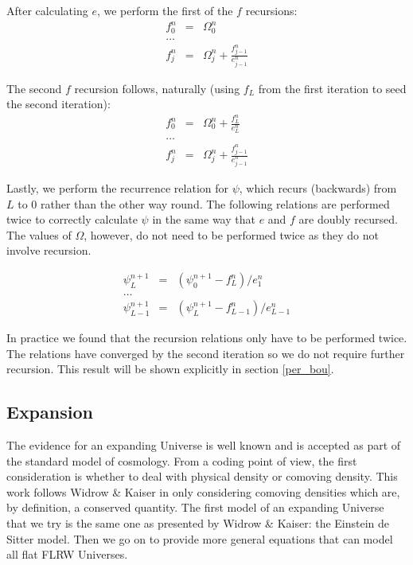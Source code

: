 \noindent After calculating $e$, we perform the first of the $f$ recursions:
\begin{eqnarray}
f_{0}^n &=&  \Omega_{0}^n \nonumber \\
\ldots \nonumber \\
f_{j}^n &=&  \Omega_{j}^n +  \frac{f_{j-1}^n}{e_{j-1}^n}
\end{eqnarray}

\noindent The second $f$ recursion follows, naturally (using $f_L$ from the first iteration to seed the second iteration):
\begin{eqnarray}
f_{0}^n &=&  \Omega_{0}^n +  \frac{f_{L}^n}{e_{L}^n} \nonumber \\
\ldots \nonumber \\
f_{j}^n &=&  \Omega_{j}^n +  \frac{f_{j-1}^n}{e_{j-1}^n}
\end{eqnarray}

\noindent Lastly, we perform the recurrence relation for $\psi$, which recurs (backwards) from $L$ to $0$ rather than the other way round. The following relations are performed twice to correctly calculate $\psi$ in the same way that $e$ and $f$ are doubly recursed. The values of $\Omega$, however, do not need to be performed twice as they do not involve recursion.

\begin{eqnarray}
\psi_{L}^{n+1} &=&  (\psi_{0}^{n+1} -f_{L}^n)/e_{1}^n \nonumber \\
\ldots \nonumber \\
\psi_{L-1}^{n+1} &=& (\psi_{L}^{n+1} -f_{L-1}^n)/e_{L-1}^n
\end{eqnarray}

In practice we found that the recursion relations only have to be performed twice. The relations have converged by the second iteration so we do not require further recursion. This result will be shown explicitly in section \ref{per_bou}.

\subsection{Expansion}
The evidence for an expanding Universe is well known and is accepted as part of the standard model of cosmology. From a coding point of view, the first consideration is whether to deal with physical density or comoving density. This work follows Widrow \& Kaiser in only considering comoving densities which are, by definition, a conserved quantity. The first model of an expanding Universe that we try is the same one as presented by Widrow \& Kaiser: the Einstein de Sitter model. Then we go on to provide more general equations that can model all flat FLRW Universes.

